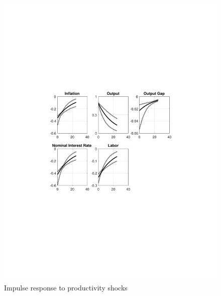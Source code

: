 \documentclass[12pt]{article}
\theoremstyle{definition}
\begin{document}
\begin{figure}[H]
	\centering
	\includegraphics[width=\linewidth, height = 0.4\textheight]{impulse_prod}
	\caption{Impulse response to productivity shocks}
	\label{fig:impulse_prod}
\end{figure}
\end{document}
